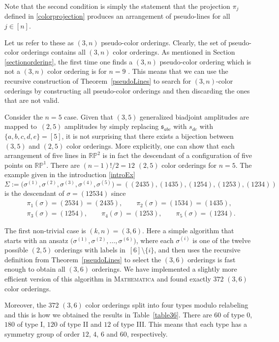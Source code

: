 \documentclass[pdftex]{sigma}
\def \s {\sigma}
\theoremstyle{definition}
\def \s {\mathfrak{s}}
\numberwithin{equation}{section}
\begin{document}
Note that the second condition is simply the statement that the projection $\pi_j$ defined in \eqref{colorprojection} produces an arrangement of pseudo-lines for all $j\in [n]$.

Let us refer to these as $(3,n)$ pseudo-color orderings. Clearly, the set of pseudo-color orderings contains all $(3,n)$ color orderings. As mentioned in
Section \ref{sectionordering}, the first time one finds a $(3,n)$ pseudo-color ordering which is not a $(3,n)$ color ordering is for $n=9$ \cite{bjorner1999oriented}. This means that we can use the recursive construction of Theorem~\ref{pseudoLines} to search for $(3,n)$-color orderings by constructing all pseudo-color orderings and then discarding the ones that are not valid.

Consider the $n=5$ case. Given that $(3,5)$ generalized biadjoint amplitudes are mapped to~$(2,5)$ amplitudes by simply replacing $\s_{abc}$ with $s_{de}$ with $\{ a,b,c,d,e\} = [5]$, it is not surprising that there exists a bijection between $(3,5)$ and $(2,5)$ color orderings. More explicitly, one can show that each arrangement of five lines in $\mathbb{RP}^2$ is in fact the descendant of a configuration of five points on $\mathbb{RP}^1$. There are $(n-1)!/2 =12$ $(2,5)$ color orderings for $n=5$. The example given in the introduction \eqref{introEx}
%
\[
\Sigma := \big(\sigma^{(1)},\sigma^{(2)},\sigma^{(3)},\sigma^{(4)},\sigma^{(5)}\big)=((2435),(1435),(1254),(1253),(1234))
\]
is the descendant of $\sigma = (12534)$ since
\begin{align*}
 & \pi_1(\sigma)=(2534)=(2435), \qquad \pi_2(\sigma)=(1534)=(1435),\\
& \pi_3(\sigma)=(1254),\qquad \pi_4(\sigma )=(1253), \qquad \pi_5(\sigma) =(1234).
\end{align*}

The first non-trivial case is $(k,n)=(3,6)$. Here a simple algorithm that starts with an ansatz $\big(\sigma^{(1)},\sigma^{(2)},\dots ,\sigma^{(6)}\big)$, where each $\sigma^{(i)}$ is one of the twelve possible $(2,5)$ orderings with labels in~$[6]\setminus \{ i \}$, and then uses the recursive definition from Theorem~\ref{pseudoLines} to select the $(3,6)$ orderings is fast enough to obtain all $(3,6)$ orderings. We have implemented a slightly more efficient version of this algorithm in \textsc{Mathematica} and found exactly $372$ $(3,6)$ color orderings.

Moreover, the $372$ $(3,6)$ color orderings split into four types modulo relabeling and this is how we obtained the results in Table~\ref{table36}. There are $60$ of type 0, $180$ of type I, $120$ of type II and $12$ of type III.
This means that each type has a symmetry group of order $12$, $4$, $6$ and $60$, respectively.
\end{document}
